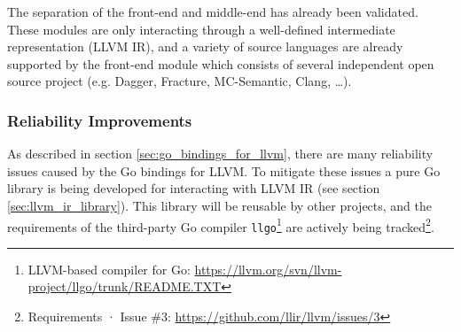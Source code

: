 The separation of the front-end and middle-end has already been validated. These modules are only interacting through a well-defined intermediate representation (LLVM IR), and a variety of source languages are already supported by the front-end module which consists of several independent open source project (e.g. Dagger, Fracture, MC-Semantic, Clang, …).


\subsubsection{Reliability Improvements}

As described in section \ref{sec:go_bindings_for_llvm}, there are many reliability issues caused by the Go bindings for LLVM. To mitigate these issues a pure Go library is being developed for interacting with LLVM IR (see section \ref{sec:llvm_ir_library}). This library will be reusable by other projects, and the requirements of the third-party Go compiler \texttt{llgo}\footnote{LLVM-based compiler for Go: \url{https://llvm.org/svn/llvm-project/llgo/trunk/README.TXT}} are actively being tracked\footnote{Requirements · Issue \#3: \url{https://github.com/llir/llvm/issues/3}}.































